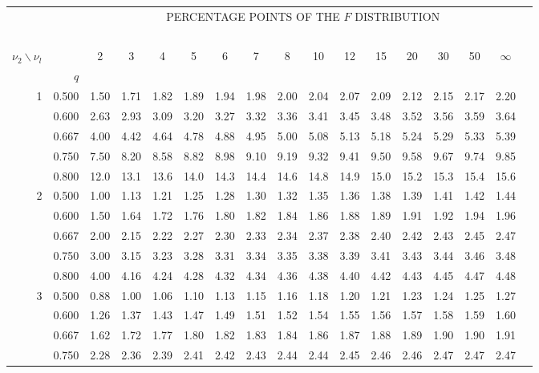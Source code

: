 {\small

\thispagestyle{empty}

\begin{center}
\begin{tabular}{rrr@{\,}r@{\,}r@{\,}r@{\,}r@{\,}r@{\,}r@{\,}r
                   @{\,}r@{\,}r@{\,}r@{\,}r@{\,}r@{\,}r@{\,}r}
&&\multicolumn{14}{c}{PERCENTAGE POINTS OF THE $F$ DISTRIBUTION}\\
\ \\
$\nu_2\backslash\nu_l$ & & 
\multicolumn{1}{c}{2} &\multicolumn{1}{c}{3} &
\multicolumn{1}{c}{4} &\multicolumn{1}{c}{5} &
\multicolumn{1}{c}{6} &\multicolumn{1}{c}{7} &
\multicolumn{1}{c}{8} &\multicolumn{1}{c}{10}&
\multicolumn{1}{c}{12}&\multicolumn{1}{c}{15}&
\multicolumn{1}{c}{20}&\multicolumn{1}{c}{30}&
\multicolumn{1}{c}{50}&\multicolumn{1}{c}{$\infty$}\\
& $q$ \\
1&0.500&1.50&1.71&1.82&1.89&1.94&1.98&2.00&2.04&2.07&2.09&2.12&2.15&2.17&2.20\\
 &0.600&2.63&2.93&3.09&3.20&3.27&3.32&3.36&3.41&3.45&3.48&3.52&3.56&3.59&3.64\\
 &0.667&4.00&4.42&4.64&4.78&4.88&4.95&5.00&5.08&5.13&5.18&5.24&5.29&5.33&5.39\\
 &0.750&7.50&8.20&8.58&8.82&8.98&9.10&9.19&9.32&9.41&9.50&9.58&9.67&9.74&9.85\\
 &0.800&12.0&13.1&13.6&14.0&14.3&14.4&14.6&14.8&14.9&15.0&15.2&15.3&15.4&15.6\\
2&0.500&1.00&1.13&1.21&1.25&1.28&1.30&1.32&1.35&1.36&1.38&1.39&1.41&1.42&1.44\\
 &0.600&1.50&1.64&1.72&1.76&1.80&1.82&1.84&1.86&1.88&1.89&1.91&1.92&1.94&1.96\\
 &0.667&2.00&2.15&2.22&2.27&2.30&2.33&2.34&2.37&2.38&2.40&2.42&2.43&2.45&2.47\\
 &0.750&3.00&3.15&3.23&3.28&3.31&3.34&3.35&3.38&3.39&3.41&3.43&3.44&3.46&3.48\\
 &0.800&4.00&4.16&4.24&4.28&4.32&4.34&4.36&4.38&4.40&4.42&4.43&4.45&4.47&4.48\\
3&0.500&0.88&1.00&1.06&1.10&1.13&1.15&1.16&1.18&1.20&1.21&1.23&1.24&1.25&1.27\\
 &0.600&1.26&1.37&1.43&1.47&1.49&1.51&1.52&1.54&1.55&1.56&1.57&1.58&1.59&1.60\\
 &0.667&1.62&1.72&1.77&1.80&1.82&1.83&1.84&1.86&1.87&1.88&1.89&1.90&1.90&1.91\\
 &0.750&2.28&2.36&2.39&2.41&2.42&2.43&2.44&2.44&2.45&2.46&2.46&2.47&2.47&2.47\\

\end{tabular}
\end{center}}
